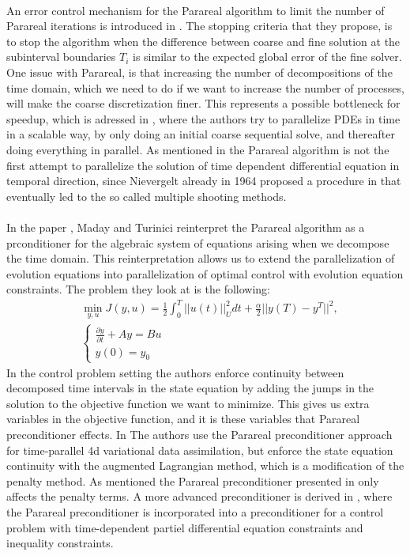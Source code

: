\\
An error control mechanism for the Parareal algorithm to limit the number of Parareal iterations is introduced in \cite{lepsa2010efficient}. The stopping criteria that they propose, is to stop the algorithm when the difference between coarse and fine solution at the subinterval boundaries $T_i$ is similar to the expected global error of the fine solver. One issue with Parareal, is that increasing the number of decompositions of the time domain, which we need to do if we want to increase the number of processes, will make the coarse discretization finer. This represents a possible bottleneck for speedup, which is adressed in \cite{rao2014adjoint}, where the authors try to parallelize PDEs in time in a scalable way, by only doing an initial coarse sequential solve, and thereafter doing everything in parallel. As mentioned in \cite{gander2007superlinear} the Parareal algorithm is not the first attempt to parallelize the solution of time dependent differential equation in temporal direction, since Nievergelt already in 1964 proposed a procedure in \cite{nievergelt1964parallel} that eventually led to the so called multiple shooting methods.
\\
\\
In the paper \cite{maday2002parareal}, Maday and Turinici reinterpret the Parareal algorithm as a prconditioner for the algebraic system of equations arising when we decompose the time domain. This reinterpretation allows us to extend the parallelization of evolution equations into parallelization of optimal control with evolution equation constraints. The problem they look at is the following:
\begin{align*}
&\min_{y,u}J(y,u) = \frac{1}{2}\int_0^T||u(t)||_U^2dt + \frac{\alpha}{2}||y(T)-y^T||^2,\\
&\left\{
     \begin{array}{lr}
       	\frac{\partial y}{\partial t}+Ay = Bu\\
       	   y(0)=y_0
     \end{array}
   \right.
\end{align*}
In the control problem setting the authors enforce continuity between decomposed time intervals in the state equation by adding the jumps in the solution to the objective function we want to minimize. This gives us extra variables in the objective function, and it is these variables that Parareal preconditioner effects. In \cite{rao2016time} The authors use the Parareal preconditioner approach for time-parallel 4d variational data assimilation, but enforce the state equation continuity with the augmented Lagrangian method, which is a modification of the penalty method\cite{nocedal2006numerical}. As mentioned the Parareal preconditioner presented in \cite{maday2002parareal} only affects the penalty terms. A more advanced preconditioner is derived in \cite{ulbrich2015preconditioners}, where the Parareal preconditioner is incorporated into a preconditioner for a control problem with time-dependent partiel differential equation constraints and inequality constraints.
